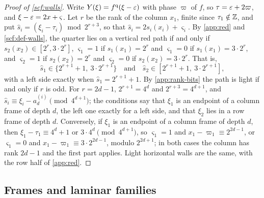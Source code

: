 \begin{proof}[Proof of \cref{scf:walls}]
Write $Y(\xi)=f^{\mathrm q}(\xi-\varepsilon)$ with phase $\varpi$ of $f$, so $\tau=\varepsilon+2\varpi$, and $\xi-\varepsilon=2x+\varsigma$. Let $r$ be the rank of the column $x_1$, finite since $\tau_1\notin\mathbb{Z}$, and put $\hat s_i=(\xi_i-\tau_i)\bmod2^{r+3}$, so that $\hat s_i=2s_i(x_i)+\varsigma_i$. By \cref{app:red} and \cref{scf:def-walls}, the quarter lies on a vertical red path if and only if $s_2(x_2)\in[2^r,3\cdot2^r]$, $\varsigma_1=1$ if $s_1(x_1)=2^r$ and $\varsigma_1=0$ if $s_1(x_1)=3\cdot2^r$, and $\varsigma_2=1$ if $s_2(x_2)=2^r$ and $\varsigma_2=0$ if $s_2(x_2)=3\cdot2^r$. That is,
\[
\hat s_1\in\{2^{r+1}+1,\ 3\cdot2^{r+1}\}\quad\text{and}\quad\hat s_2\in[2^{r+1}+1,\ 3\cdot2^{r+1}],
\]
with a left side exactly when $\hat s_1=2^{r+1}+1$. By \cref{app:rank-bits} the path is light if and only if $r$ is odd. For $r=2d-1$, $2^{r+1}=4^d$ and $2^{r+3}=4^{d+1}$, and $\hat s_i\equiv\xi_i-a^{(i)}_d\pmod{4^{d+1}}$; the conditions say that $\xi_1$ is an endpoint of a column frame of depth $d$, the left one exactly for a left side, and that $\xi_2$ lies in a row frame of depth $d$. Conversely, if $\xi_1$ is an endpoint of a column frame of depth $d$, then $\xi_1-\tau_1\equiv4^d+1$ or $3\cdot4^d\pmod{4^{d+1}}$, so $\varsigma_1=1$ and $x_1-\varpi_1\equiv2^{2d-1}$, or $\varsigma_1=0$ and $x_1-\varpi_1\equiv3\cdot2^{2d-1}$, modulo $2^{2d+1}$; in both cases the column has rank $2d-1$ and the first part applies. Light horizontal walls are the same, with the row half of \cref{app:red}.
\end{proof}

\subsection{Frames and laminar families}

